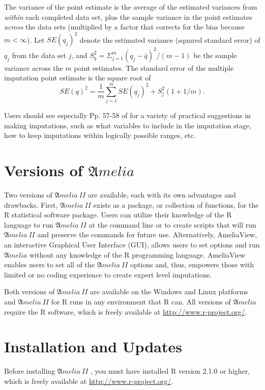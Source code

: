 \documentclass[12pt,titlepage]{article}
\newcommand{\Amelia}{\ensuremath{\mathfrak Amelia} }
\newcommand{\AmeliaII}{\ensuremath{\mathfrak Amelia~II} }
\begin{document}
The variance of the point estimate is the average of the estimated
variances from \emph{within} each completed data set, plus the sample
variance in the point estimates \emph{across} the data sets
(multiplied by a factor that corrects for the bias because
$m<\infty$).  Let $SE(q_j)^2$ denote the estimated variance (squared
standard error) of $q_j$ from the data set $j$, and
$S^{2}_{q}=\Sigma^{m}_{j=1}(q_j-\bar{q})^2/(m-1)$ be the sample
variance across the $m$ point estimates.  The standard error of the
multiple imputation point estimate is the square root of
\begin{equation}
SE(q)^2=\frac{1}{m}\sum^{m}_{j=1}SE(q_j)^2+S^{2}_{j}(1+1/m).
\end{equation}

Users should see especially Pp. 57-58 of \citet{KinHonJos01} for a
variety of practical suggestions in making imputations, such as what
variables to include in the imputation stage, how to keep imputations
within logically possible ranges, etc.

\section{Versions of ${\mathfrak Amelia}$}
\label{sec:versions}
Two versions of \AmeliaII are available, each with its own advantages
and drawbacks.  First, \AmeliaII exists as a package, or collection of
functions, for the R statistical software package.  Users can utilize
their knowledge of the R language to run \AmeliaII at the command line
or to create scripts that will run \AmeliaII and preserve the commands
for future use.  Alternatively, AmeliaView, an interactive Graphical
User Interface (GUI), allows users to set options and run \Amelia
without any knowledge of the R programming language.  AmeliaView
enables users to set all of the \AmeliaII options and, thus, empowers
those with limited or no coding experience to create expert level
imputations.

Both versions of \AmeliaII are available on the Windows and Linux
platforms and \AmeliaII for R runs in any environment that R can.  All
versions of ${\mathfrak Amelia}$ require the R software, which is
freely available at \url{http://www.r-project.org/}.


\section{Installation and Updates}
\label{sec:install}

Before installing \AmeliaII, you must have installed R version 2.1.0
or higher, which is freely available at
\url{http://www.r-project.org/}.
\end{document}
